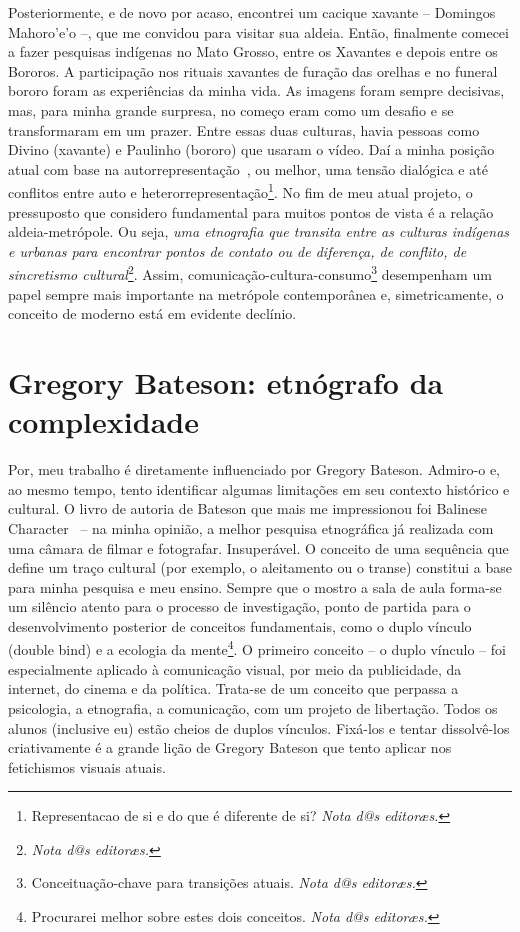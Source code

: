 \documentclass[a4paper, 11pt]{article} %
\makeatletter
\newcommand{\ftnt}[1]{\footnote{#1 \emph{Nota d@s editoræs.}}}
\makeatother
\begin{document}
Posteriormente, e de novo por acaso, encontrei um cacique xavante – Domingos Mahoro’e’o –, que me convidou para visitar sua aldeia. Então, finalmente comecei a fazer pesquisas indígenas no Mato Grosso, entre os Xavantes e depois entre os Bororos. A participação nos rituais xavantes de furação das orelhas e no funeral bororo foram as experiências da minha vida. As imagens foram sempre decisivas, mas, para minha grande surpresa, no começo eram como um desafio e se transformaram em um prazer. Entre essas duas culturas, havia pessoas como Divino (xavante) e Paulinho (bororo) que usaram o vídeo. Daí a minha posição atual com base na autorrepresentação~\cite{b2}, ou melhor, uma tensão dialógica e até conflitos entre auto e heterorrepresentação\ftnt{Representacao de si e do que é diferente de si?}. No fim de meu atual projeto, o pressuposto que considero fundamental para muitos pontos de vista é a relação aldeia-metrópole. Ou seja, \emph{uma etnografia que transita entre as culturas indígenas e urbanas para encontrar pontos de contato ou de diferença, de conflito, de sincretismo cultural}\ftnt{}. Assim, comunicação-cultura-consumo\ftnt{Conceituação-chave para transições atuais.} desempenham um papel sempre mais importante na metrópole contemporânea e, simetricamente, o conceito de moderno está em evidente declínio.
\nocite{b3}


\section*{Gregory Bateson: etnógrafo da complexidade}\label{sec:bat}

Por, meu trabalho é diretamente influenciado por Gregory Bateson. Admiro-o e, ao mesmo tempo, tento identificar algumas limitações em seu contexto histórico e cultural. O livro de autoria de Bateson que mais me impressionou foi Balinese Character~\cite{b4} – na minha opinião, a melhor pesquisa etnográfica já realizada com uma câmara de filmar e fotografar. Insuperável. O conceito de uma sequência que define um traço cultural (por exemplo, o aleitamento ou o transe) constitui a base para minha pesquisa e meu ensino. Sempre que o mostro a sala de aula forma-se um silêncio atento para o processo de investigação, ponto de partida para o desenvolvimento posterior de conceitos fundamentais, como o duplo vínculo (double bind) e a ecologia da mente\ftnt{Procurarei melhor sobre estes dois conceitos.}. O primeiro conceito – o duplo vínculo – foi especialmente aplicado à comunicação visual, por meio da publicidade, da internet, do cinema e da política. Trata-se de um conceito que perpassa a psicologia, a etnografia, a comunicação, com um projeto de libertação. Todos os alunos (inclusive eu) estão cheios de duplos vínculos. Fixá-los e tentar dissolvê-los criativamente é a grande lição de Gregory Bateson que tento aplicar nos fetichismos visuais atuais.
\end{document}
